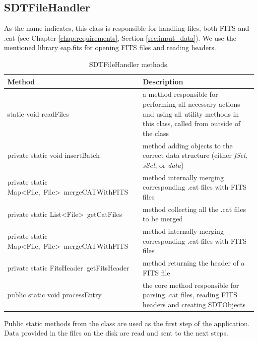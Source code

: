 \newpage

\subsection{SDTFileHandler}\label{sec:file_handler}

	As the name indicates, this class is responsible for handling files, both FITS and .cat (see Chapter \ref{chap:requirements}, Section \ref{sec:input_data}). We use the mentioned library eap.fits for opening FITS files and reading headers.
	
\begin{table}[H]
\centering
\setlength{\extrarowheight}{2pt}
\begin{tabularx}{\textwidth}{|X|X|}
\hline
\textbf{Method} & \textbf{Description} \\ \hline
static void \mbox{readFiles} & a method responsible for performing all necessary actions and using all utility methods in this class, called from outside of the class \\ \hline
private static void \mbox{insertBatch} & method adding objects to the correct data structure (either \emph{fSet}, \emph{sSet}, or \emph{data}) \\ \hline
private static \mbox{Map<File, File> mergeCATWithFITS} & method internally merging corresponding .cat files with FITS files \\ \hline
private static \mbox{List<File> getCatFiles} & method collecting all the .cat files to be merged \\ \hline
private static \mbox{Map<File, File> mergeCATWithFITS} & method internally merging corresponding .cat files with FITS files \\ \hline
private static \mbox{FitsHeader getFitsHeader} & method returning the header of a FITS file \\ \hline
public static void \mbox{processEntry} & the core method responsible for parsing .cat files, reading FITS headers and creating SDTObjects \\ \hline
\end{tabularx}
\caption{SDTFileHandler methods.}
\label{tab:class_methods_FH}
\end{table}

	Public static methods from the class are used as the first step of the application. Data provided in the files on the disk are read and sent to the next steps.

